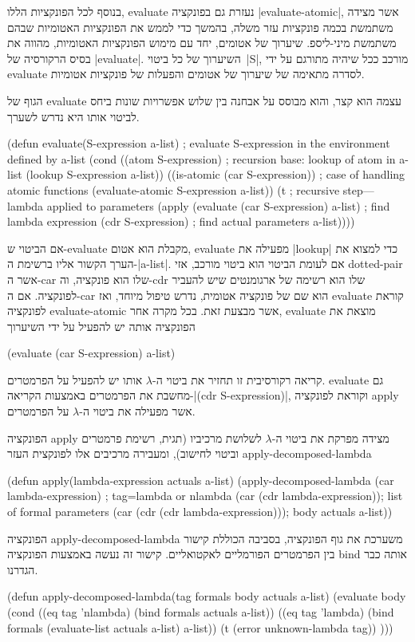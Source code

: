 בנוסף לכל הפונקציות הללו, evaluate נעזרת גם בפונקציה \E|evaluate-atomic|, אשר
מצידה משתמשת בכמה פונקציות עזר משלה, בהמשך כדי לממש את הפונקציות האטומיות שבהם
משתמשת מיני-ליספ. שיערוך של אטומים, יחד עם מימוש הפונקציות האטומיות, מהווה את
בסיס הרקורסיה של \E|evaluate|. השיערוך של כל ביטוי~\E|S|, מורכב ככל שיהיה
מתורגם על ידי evaluate לסדרה מתאימה של שיערוך של אטומים והפעלות של פונקציות
אטומיות.

הגוף של evaluate עצמה הוא קצר, והוא מבוסס על אבחנה בין שלוש אפשרויות שונות ביחס
לביטוי אותו היא נדרש לשערך.

\minipage\textwidth
\begin{KERNEL}
(defun evaluate(S-expression a-list) ; evaluate S-expression in the environment defined by a-list
  (cond ((atom S-expression) ; recursion base: lookup of atom in a-list
          (lookup S-expression a-list))
        ((is-atomic (car S-expression)) ; case of handling atomic functions
          (evaluate-atomic S-expression a-list))
        (t ; recursive step---lambda applied to parameters
          (apply (evaluate (car S-expression) a-list) ; find lambda expression
                  (cdr S-expression) ; find actual parameters
                  a-list))))
\end{KERNEL}
\endminipage

אם הביטוי ש-evaluate מקבלת הוא אטום, evaluate מפעילה את \E|lookup| כדי למצוא את
הערך הקשור אליו ברשימת ה-\E|a-list|. אם לעומת הביטוי הוא ביטוי מורכב, אזי
dotted-pair אשר ה-car שלו הוא פונקציה, וה-cdr שלו הוא רשימה של
ארגומנטים שיש להעביר לפונקציה. אם ה-car הוא שם של פונקציה אטומית, נדרש טיפול
מיוחד, ואז evaluate קוראת לפונקציה evaluate-atomic אשר מבצעת זאת.
בכל מקרה אחר, evaluate מוצאת את הפונקציה אותה יש להפעיל על ידי השיערוך
\begin{LISP}
(evaluate (car S-expression) a-list)
\end{LISP}
קריאה רקורסיבית זו תחזיר את ביטוי ה-$λ$ אותו יש להפעיל על הפרמטרים. evaluate
גם מחשבת את הפרמטרים באמצעות הקריאה-\T|(cdr S-expression)|, וקוראת לפונקציה
apply אשר מפעילה את ביטוי ה-$λ$ על הפרמטרים.

הפונקציה apply מצידה מפרקת את ביטוי ה-$λ$ לשלושת מרכיביו (תגית, רשימת פרמטרים
וביטוי לחישוב), ומעבירה מרכיבים אלו לפונקצית העזר apply-decomposed-lambda
\begin{KERNEL}
(defun apply(lambda-expression actuals a-list)
  (apply-decomposed-lambda
    (car lambda-expression) ; tag=lambda or nlambda
    (car (cdr lambda-expression)); list of formal parameters
    (car (cdr (cdr lambda-expression))); body
    actuals
    a-list))
\end{KERNEL}
הפונקציה apply-decomposed-lambda משערכת את גוף הפונקציה, בסביבה הכוללת קישור בין
הפרמטרים הפורמליים לאקטואליים. קישור זה נעשה באמצעות הפונקציה bind אותה כבר
הגדרנו.
\begin{KERNEL}
(defun apply-decomposed-lambda(tag formals body actuals a-list)
  (evaluate body
    (cond ((eq tag 'nlambda) (bind formals actuals a-list))
          ((eq tag 'lambda) (bind formals (evaluate-list actuals a-list) a-list))
          (t (error unknown-lambda tag))
)))
\end{KERNEL}

